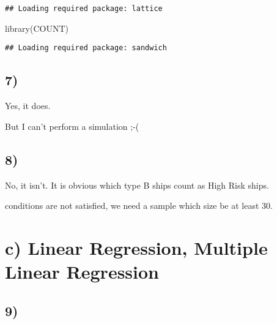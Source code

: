 \documentclass[
]{article}
\newenvironment{Shaded}{\begin{snugshade}}{\end{snugshade}}
\newcommand{\DecValTok}[1]{\textcolor[rgb]{0.00,0.00,0.81}{#1}}
\newcommand{\FunctionTok}[1]{\textcolor[rgb]{0.00,0.00,0.00}{#1}}
\newcommand{\NormalTok}[1]{#1}
\newcommand{\OtherTok}[1]{\textcolor[rgb]{0.56,0.35,0.01}{#1}}
\newcommand{\SpecialCharTok}[1]{\textcolor[rgb]{0.00,0.00,0.00}{#1}}
\newcommand{\StringTok}[1]{\textcolor[rgb]{0.31,0.60,0.02}{#1}}
\begin{document}
\begin{verbatim}
## Loading required package: lattice
\end{verbatim}

\begin{Shaded}
\begin{Highlighting}[]
\FunctionTok{library}\NormalTok{(COUNT)}
\end{Highlighting}
\end{Shaded}

\begin{verbatim}
## Loading required package: sandwich
\end{verbatim}

\begin{Shaded}
\end{Shaded}

\hypertarget{section-6}{%
\subsection{7)}\label{section-6}}

Yes, it does.

But I can't perform a simulation ;-(

\hypertarget{section-7}{%
\subsection{8)}\label{section-7}}

No, it isn't. It is obvious which type B ships count as High Risk ships.

conditions are not satisfied, we need a sample which size be at least
30.

\hypertarget{c-linear-regression-multiple-linear-regression}{%
\section{c) Linear Regression, Multiple Linear
Regression}\label{c-linear-regression-multiple-linear-regression}}

\hypertarget{section-8}{%
\subsection{9)}\label{section-8}}
\end{document}
